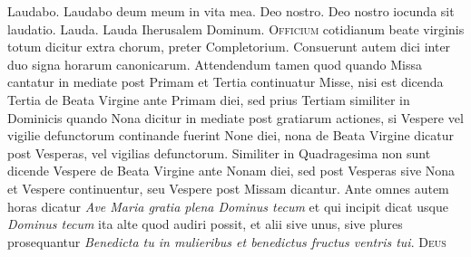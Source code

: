 \begin{multicols*}{2}
 Laudabo.
 Laudabo deum meum in vita mea.
 Deo nostro.
 Deo nostro iocunda sit laudatio.
 Lauda.
 Lauda Iherusalem Dominum.
\color{Red} 
\lettrine[lines=2]{\zallmancaps \color{Blue} O}{fficium} cotidianum beate virginis totum dicitur extra chorum, preter Completorium. Consuerunt autem dici inter duo signa horarum canonicarum. Attendendum tamen quod quando Missa cantatur in mediate post Primam et Tertia continuatur Misse, nisi est dicenda Tertia de Beata Virgine ante Primam diei, sed prius Tertiam similiter in Dominicis quando Nona dicitur in mediate post gratiarum actiones, si Vespere vel vigilie defunctorum continande fuerint None diei, nona de Beata Virgine dicatur post Vesperas, vel vigilias defunctorum. Similiter in Quadragesima non sunt dicende Vespere de Beata Virgine ante Nonam diei, sed post Vesperas sive Nona et Vespere continuentur, seu Vespere post Missam dicantur. Ante omnes autem horas dicatur {\color{black} \textit{Ave Maria gratia plena Dominus tecum}} et qui incipit dicat usque {\color{black} \textit{Dominus tecum}} ita alte quod audiri possit, et alii sive unus, sive plures prosequantur {\color{black} \textit{Benedicta tu in mulieribus et benedictus fructus ventris tui}}. \color{black}
{\color{Red} }
\lettrine[lines=2]{\zallmancaps \color{Red} D}{eus} 










\end{multicols*}


